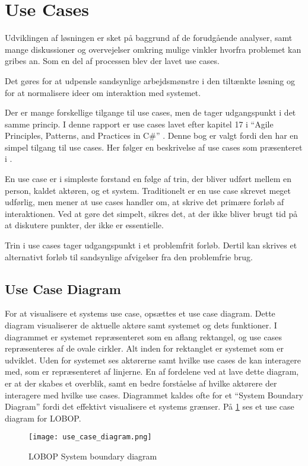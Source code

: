 \section{Use Cases}

Udviklingen af løsningen er sket på baggrund af de forudgående analyser, samt mange diskussioner og overvejelser omkring mulige vinkler hvorfra problemet kan gribes an. Som en del af processen blev der lavet use cases. 

Det gøres for at udpensle sandsynlige arbejdsmønstre i den tiltænkte løsning og for at normalisere ideer om interaktion med systemet.

Der er mange forskellige tilgange til use cases, men de tager udgangspunkt i det samme princip. I denne rapport er use cases lavet efter kapitel 17 i \enquote{Agile Principles, Patterns, and Practices in C\#} \cite{martin2006agile}. Denne bog er valgt fordi den har en simpel tilgang til use cases. Her følger en beskrivelse af use cases som præsenteret i \cite{martin2006agile}.

En use case er i simpleste forstand en følge af trin, der bliver udført mellem en person, kaldet aktøren, og et system. Traditionelt er en use case skrevet meget udførlig, men \cite{martin2006agile} mener at use cases handler om, at skrive det primære forløb af interaktionen. Ved at gøre det simpelt, sikres det, at der ikke bliver brugt tid på at diskutere punkter, der ikke er essentielle.

Trin i use cases tager udgangspunkt i et problemfrit forløb. Dertil kan skrives et alternativt forløb til sandsynlige afvigelser fra den problemfrie brug.

\subsection*{Use Case Diagram}

For at visualisere et systems use case, opsættes et use case diagram. Dette diagram visualiserer de aktuelle aktøre samt systemet og dets funktioner. I diagrammet er systemet repræsenteret som en aflang rektangel, og use cases repræsenteres af de ovale cirkler. Alt inden for rektanglet er systemet som er udviklet. Uden for systemet ses aktørerne samt hvilke use cases de kan interagere med, som er repræsenteret af linjerne. En af fordelene ved at lave dette diagram, er at der skabes et overblik, samt en bedre forståelse af hvilke aktørere der interagere med hvilke use cases. Diagrammet kaldes ofte for et \enquote{System Boundary Diagram} fordi det effektivt visualisere et systems grænser. På \cref{fig:usecase} ses et use case diagram for LOBOP.

\begin{figure}
  \centering
    \texttt{[image: use\_case\_diagram.png]}
  \caption{LOBOP System boundary diagram}
  \label{fig:usecase}
\end{figure}